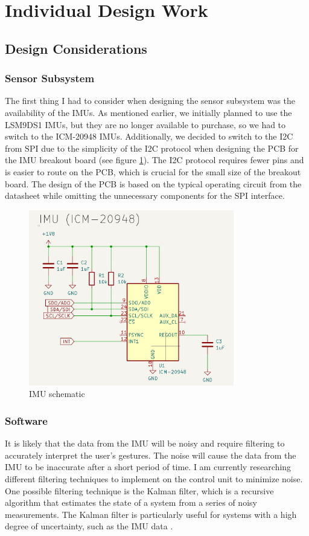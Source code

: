 \documentclass[12pt]{article}
\begin{document}
\section{Individual Design Work}
\subsection{Design Considerations}
\subsubsection{Sensor Subsystem}


The first thing I had to consider when designing the sensor subsystem was the availability of the IMUs. As mentioned earlier, we initially planned to use the LSM9DS1 IMUs, but they are no longer available to purchase, so we had to switch to the ICM-20948 IMUs. Additionally, we decided to switch to the I2C from SPI due to the simplicity of the I2C protocol when designing the PCB for the IMU breakout board (see figure \ref{fig:IMU_breakout}). The I2C protocol requires fewer pins and is easier to route on the PCB, which is crucial for the small size of the breakout board. The design of the PCB is based on the typical operating circuit from the datasheet \cite{ICM20948Datasheet} while omitting the unnecessary components for the SPI interface. 
\begin{figure}[ht]
    \centering
    \includegraphics[width=0.8\textwidth]{images/IMU_schematic.png}
    \caption{IMU schematic}
    \label{fig:IMU_breakout}
\end{figure}
\subsubsection{Software}
It is likely that the data from the IMU will be noisy and require filtering to accurately interpret the user's gestures. The noise will cause the data from the IMU to be inaccurate after a short period of time. I am currently researching different filtering techniques to implement on the control unit to minimize noise. One possible filtering technique is the Kalman filter, which is a recursive algorithm that estimates the state of a system from a series of noisy measurements. The Kalman filter is particularly useful for systems with a high degree of uncertainty, such as the IMU data \cite{Palanisamy2016}.
\end{document}
